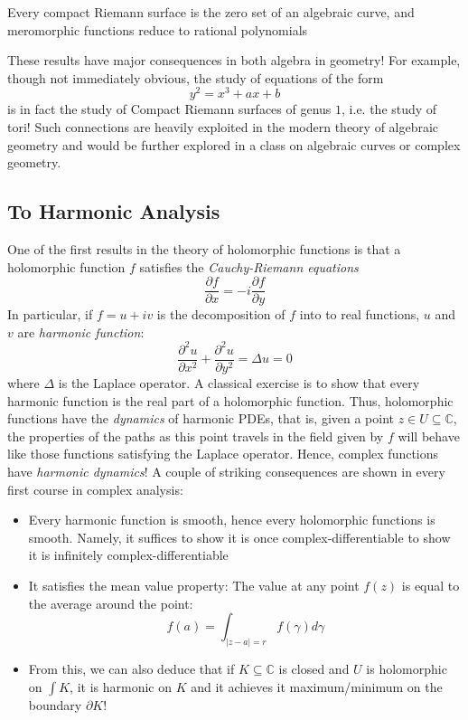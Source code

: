 \documentclass[oneside]{article}
\newcommand{\C}{\mathbb{C}}
\newcommand{\sse}{\subseteq}
\begin{document}
\begin{center}
    \addtolength{\leftskip}{2cm}  %
    \addtolength{\rightskip}{2cm} %
  Every compact Riemann surface is the zero set of an algebraic curve, and meromorphic functions reduce to
  rational polynomials
\end{center}

These results have major consequences in both algebra in geometry! For example, though not immediately
obvious, the study of equations of the form
\[
  y^2 = x^3 + ax + b
\]
is in fact the study of Compact Riemann surfaces of genus $1$, i.e. the study of tori! Such connections are
heavily exploited in the modern theory of algebraic geometry and would be further explored in a class on
algebraic curves or complex geometry.


\subsection{To Harmonic Analysis}

One of the first results in the theory of holomorphic functions is that a holomorphic function $f$ satisfies
the \emph{Cauchy-Riemann equations}
\[
  \frac{\partial f}{\partial x} = - i\frac{\partial f}{\partial y}
\]
In particular, if $f = u+iv$ is the decomposition of $f$ into to real functions, $u$ and $v$ are \emph{harmonic
function}:
\[
  \frac{\partial^2 u}{\partial x^2} + \frac{\partial^2 u}{\partial y^2} = \Delta u = 0
\]
where $\Delta$ is the Laplace operator. A classical exercise is to show that every harmonic function is the
real part of a holomorphic function. Thus, holomorphic functions have the \emph{dynamics} of harmonic PDEs,
that is, given a point $z \in U \sse \C$, the properties of the paths as this point travels in the field given
by $f$ will behave like those functions satisfying the Laplace operator. Hence, complex functions have
\emph{harmonic dynamics}! A couple of striking consequences are shown in every first course in
complex analysis:

\begin{itemize}
  \item Every harmonic function is smooth, hence every holomorphic functions is smooth. Namely, it suffices to
    show it is once complex-differentiable to show it is infinitely complex-differentiable
  \item It satisfies the mean value property: The value at any point $f(z)$ is equal to the average around
    the point:
    \[
      f(a) = \int_{|z-a|=r} f(\gamma)d\gamma
    \]
  \item From this, we can also deduce that if $K \sse \C$ is closed and $U$ is holomorphic on $\int K$, it is
    harmonic on $K$ and it achieves it maximum/minimum on the boundary $\partial K$!
\end{itemize}
\end{document}
